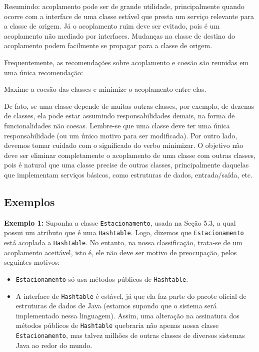 \documentclass[
  11pt,
  twoside]{book}
\newcommand{\passthrough}[1]{#1}
\renewenvironment{quote}{\centering \vspace{1.5ex} \begin{tcolorbox}[colback=backcolor, width=4.9in]}{\end{tcolorbox}}
\begin{document}
Resumindo: acoplamento pode ser de grande utilidade, principalmente
quando ocorre com a interface de uma classe estável que presta um
serviço relevante para a classe de origem. Já o acoplamento ruim deve
ser evitado, pois é um acoplamento não mediado por interfaces. Mudanças
na classe de destino do acoplamento podem facilmente se propagar para a
classe de origem.

Frequentemente, as recomendações sobre acoplamento e coesão são reunidas
em uma única recomendação:

\begin{quote}
Maxime a coesão das classes e minimize o acoplamento entre elas.
\end{quote}

De fato, se uma classe depende de muitas outras classes, por exemplo, de
dezenas de classes, ela pode estar assumindo responsabilidades demais,
na forma de funcionalidades não coesas. Lembre-se que uma classe deve
ter uma única responsabilidade (ou um único motivo para ser modificada).
Por outro lado, devemos tomar cuidado com o significado do verbo
minimizar. O objetivo não deve ser eliminar completamente o acoplamento
de uma classe com outras classes, pois é natural que uma classe precise
de outras classes, principalmente daquelas que implementam serviços
básicos, como estruturas de dados, entrada/saída, etc.

\hypertarget{exemplos-1}{%
\subsection{Exemplos}\label{exemplos-1}}

\textbf{Exemplo 1:} Suponha a classe
\passthrough{\lstinline!Estacionamento!}, usada na Seção 5.3, a qual
possui um atributo que é uma \passthrough{\lstinline!Hashtable!}. Logo,
dizemos que \passthrough{\lstinline!Estacionamento!} está acoplada a
\passthrough{\lstinline!Hashtable!}. No entanto, na nossa classificação,
trata-se de um acoplamento aceitável, isto é, ele não deve ser motivo de
preocupação, pelos seguintes motivos:

\begin{itemize}
\item
  \passthrough{\lstinline!Estacionamento!} só usa métodos públicos de
  \passthrough{\lstinline!Hashtable!}.
\item
  A interface de \passthrough{\lstinline!Hashtable!} é estável, já que
  ela faz parte do pacote oficial de estruturas de dados de Java
  (estamos supondo que o sistema será implementado nessa linguagem).
  Assim, uma alteração na assinatura dos métodos públicos de
  \passthrough{\lstinline!Hashtable!} quebraria não apenas nossa classe
  \passthrough{\lstinline!Estacionamento!}, mas talvez milhões de outras
  classes de diversos sistemas Java ao redor do mundo.
\end{itemize}
\end{document}
